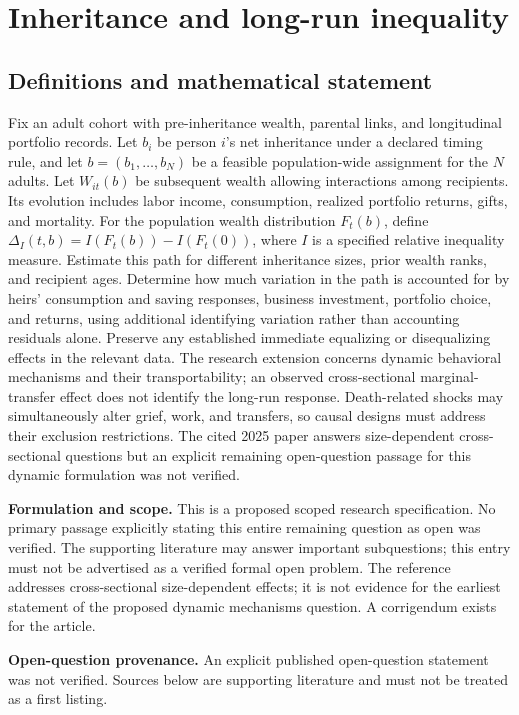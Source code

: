 \documentclass[11pt]{article}
\begin{document}
\section*{Inheritance and long-run inequality}\label{30007651}
\subsection{Definitions and mathematical statement}
Fix an adult cohort with pre-inheritance wealth, parental links, and longitudinal portfolio records. Let \(b_i\) be person \(i\)'s net inheritance under a declared timing rule, and let \(b=(b_1,\ldots,b_N)\) be a feasible population-wide assignment for the \(N\) adults. Let \(W_{it}(b)\) be subsequent wealth allowing interactions among recipients. Its evolution includes labor income, consumption, realized portfolio returns, gifts, and mortality. For the population wealth distribution \(F_t(b)\), define \(\Delta_I(t,b)=I(F_t(b))-I(F_t(0))\), where \(I\) is a specified relative inequality measure. Estimate this path for different inheritance sizes, prior wealth ranks, and recipient ages. Determine how much variation in the path is accounted for by heirs' consumption and saving responses, business investment, portfolio choice, and returns, using additional identifying variation rather than accounting residuals alone. Preserve any established immediate equalizing or disequalizing effects in the relevant data. The research extension concerns dynamic behavioral mechanisms and their transportability; an observed cross-sectional marginal-transfer effect does not identify the long-run response. Death-related shocks may simultaneously alter grief, work, and transfers, so causal designs must address their exclusion restrictions. The cited 2025 paper answers size-dependent cross-sectional questions but an explicit remaining open-question passage for this dynamic formulation was not verified.

\par\textbf{Formulation and scope.} This is a proposed scoped research specification. No primary passage explicitly stating this entire remaining question as open was verified. The supporting literature may answer important subquestions; this entry must not be advertised as a verified formal open problem. The reference addresses cross-sectional size-dependent effects; it is not evidence for the earliest statement of the proposed dynamic mechanisms question. A corrigendum exists for the article.

\par\textbf{Open-question provenance.} An explicit published open-question statement was not verified. Sources below are supporting literature and must not be treated as a first listing.
\end{document}
